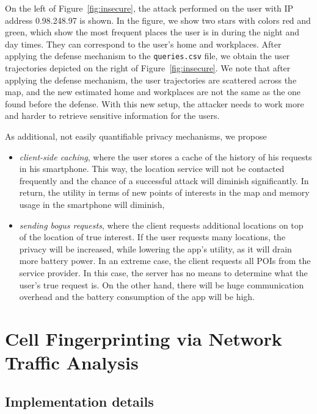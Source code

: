 \documentclass[9pt,conference]{IEEEtran}
\begin{document}
On the left of Figure~\ref{fig:insecure}, the attack performed on the user with IP address 0.98.248.97 is shown. In the figure, we show two stars with colors red and green, which show the most frequent places the user is in during the night and day times. They can correspond to the user's home and workplaces. After applying the defense mechanism to the \texttt{queries.csv} file, we obtain the user trajectories depicted on the right of Figure~\ref{fig:insecure}. We note that after applying the defense mechanism, the user trajectories are scattered across the map, and the new estimated home and workplaces are not the same as the one found before the defense. With this new setup, the attacker needs to work more and harder to retrieve sensitive information for the users.

As additional, not easily quantifiable privacy mechanisms, we propose

\begin{itemize}
    \item \textit{client-side caching}, where the user stores a cache of the history of his requests in his smartphone. This way, the location service will not be contacted frequently and the chance of a successful attack will diminish significantly. In return, the utility in terms of new points of interests in the map and memory usage in the smartphone will diminish,
    \item \textit{sending bogus requests}, where the client requests additional locations on top of the location of true interest. If the user requests many locations, the privacy will be increased, while lowering the app's utility, as it will drain more battery power. In an extreme case, the client requests all POIs from the service provider. In this case, the server has no means to determine what the user's true request is. On the other hand, there will be huge communication overhead and the battery consumption of the app will be high.
\end{itemize}

\section{Cell Fingerprinting via Network Traffic Analysis}
\label{sec:fingerprint}

\subsection{Implementation details}
\end{document}
